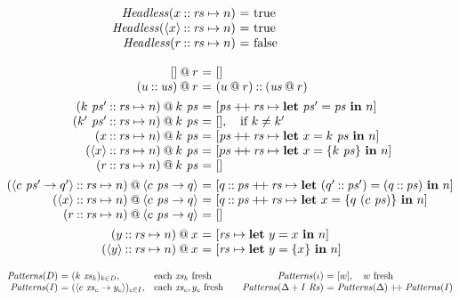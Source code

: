 \documentclass{sigplanconf}
\makeatletter
\newcommand\ba{\begin{array}}
\newcommand\ea{\end{array}}
\newenvironment{equations}{\[\ba{@{}r@{~}c@{~}l@{}}}{\ea\]\ignorespacesafterend}
\newenvironment{eqs}{\ba{@{}r@{~}c@{~}l@{}}}{\ea}
\newcommand{\key}[1]{\mathbf{#1}} %
\newcommand{\handleSymbol}{\rightarrow}
\newcommand{\handle}[2]{{#1} \handleSymbol {#2}}
\newcommand{\thunk}[1]{\{{#1}\}}
\newcommand{\effin}[1]{\langle {#1} \rangle}
\newcommand{\id}{\iota}
\makeatother
\begin{document}
\begin{figure*}
\begin{equations}
  \hdless(x \cons \rs \mapsto n) &=& \true\\
  \hdless(\effin{x} \cons \rs \mapsto n) &=& \true\\
  \hdless(r \cons \rs \mapsto n) &=& \false\\
\end{equations}

\begin{equations}
   \emptylist \proj r &=& \emptylist \\
(u \cons \us) \proj r &=& (u \proj r) \cons (\us \proj r) \\[1ex]
(k~\ps' \cons \rs \mapsto n) \proj k~\ps &=&
        [\ps \concat \rs \mapsto \key{let}~\ps' = \ps~\key{in}~n] \\
(k'~\ps' \cons \rs \mapsto n) \proj k~\ps &=& [], \quad \text{if }k \neq k'\\
    (x \cons \rs \mapsto n) \proj k~\ps &=&
        [\ps \concat \rs \mapsto \key{let}~x = k~\ps~\key{in}~n] \\
(\effin{x} \cons \rs \mapsto n) \proj k~\ps &=& [ps \concat \rs \mapsto
          \key{let}~x = \thunk{k~\ps}~\key{in}~n]\\
     (r \cons \rs \mapsto n) \proj k~\ps &=& \emptylist \\[1ex]
%
%

(\effin{\handle{c~\ps'}{q'}} \cons \rs \mapsto n) \proj \effin{\handle{c~\ps}{q}} &=&
  [q \cons \ps \concat \rs \mapsto \key{let}~(q' \cons \ps') = (q \cons \ps)~\key{in}~n] \\
(\effin{x} \cons \rs \mapsto n) \proj \effin{\handle{c~\ps}{q}} &=&
  [q \cons \ps \concat \rs \mapsto \key{let}~x = \thunk{q~(c~\ps)}~\key{in}~n] \\
(r \cons \rs \mapsto n) \proj \effin{\handle{c~\ps}{q}} &=& \emptylist \\[1ex]
(y \cons \rs \mapsto n) \proj x &=& [\rs \mapsto \key{let}~y = x~\key{in}~n] \\
(\effin{y} \cons \rs \mapsto n) \proj x &=&
  [\rs \mapsto \key{let}~y = \thunk{x}~\key{in}~n] \\
\end{equations}

\[
\ba{@{}r@{~}c@{~}l@{\quad}l@{}}
\Patterns(D) &=& (k~\xs_k)_{k \in D},  &\text{each }\xs_k \text{ fresh} \\
\Patterns(I) &=& (\effin{\handle{c~\xs_c}{y_c}})_{c \in I}, &\text{each }\xs_c, y_c \text{ fresh} \\
\ea
\qquad
\begin{eqs}
\Patterns(\id) &=& [w], \quad w \text{ fresh} \\
\Patterns(\Delta + I~\Rs) &=& \Patterns(\Delta) \concat \Patterns(I) \\
\end{eqs}
\]


\end{figure*}
\end{document}
